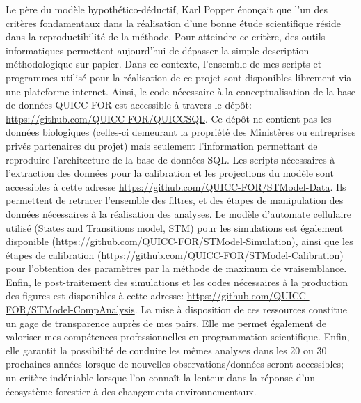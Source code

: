 Le père du modèle hypothético-déductif, Karl Popper énonçait que l'un des critères fondamentaux dans
la réalisation d'une bonne étude scientifique réside dans la reproductibilité de la méthode. Pour
atteindre ce critère, des outils informatiques permettent aujourd'hui de dépasser la simple
description méthodologique sur papier. Dans ce contexte, l'ensemble de mes scripts et programmes
utilisé pour la réalisation de ce projet sont disponibles librement via une plateforme internet.
Ainsi, le code nécessaire à la conceptualisation de la base de données QUICC-FOR est accessible à
travers le dépôt: \url{https://github.com/QUICC-FOR/QUICCSQL}. Ce dépôt ne contient pas les données
biologiques (celles-ci demeurant la propriété des Ministères ou entreprises privés partenaires du
projet) mais seulement l'information permettant de reproduire l'architecture de la base de données
SQL. Les scripts nécessaires à l'extraction des données pour la calibration et les projections du
modèle sont accessibles à cette adresse \url{https://github.com/QUICC-FOR/STModel-Data}. Ils
permettent de retracer l'ensemble des filtres, et des étapes de manipulation des données nécessaires à
la réalisation des analyses. Le modèle d'automate cellulaire utilisé (States and Transitions model,
STM) pour les simulations est également disponible
(\url{https://github.com/QUICC-FOR/STModel-Simulation}), ainsi que les étapes de calibration
(\url{https://github.com/QUICC-FOR/STModel-Calibration}) pour l'obtention des paramètres par la
méthode de maximum de vraisemblance. Enfin, le post-traitement des simulations et les codes
nécessaires à la production des figures est disponibles à cette adresse:
\url{https://github.com/QUICC-FOR/STModel-CompAnalysis}. La mise à disposition de ces ressources
constitue un gage de transparence auprès de mes pairs. Elle me permet également de valoriser mes
compétences professionnelles en programmation scientifique. Enfin, elle garantit la possibilité de
conduire les mêmes analyses dans les 20 ou 30 prochaines années lorsque de nouvelles
observations/données seront accessibles; un critère indéniable lorsque l'on connaît la lenteur dans
la réponse d'un écosystème forestier à des changements environnementaux.



